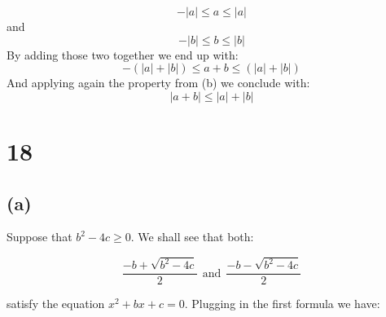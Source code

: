 \documentclass{article}
\begin{document}
\begin{equation*}
	-|a| \leq a \leq |a|
\end{equation*}
and
\begin{equation*}
	-|b| \leq b \leq |b|
\end{equation*}
By adding those two together we end up with:
\begin{equation*}
	-(|a| + |b|) \leq a + b \leq (|a| + |b|)
\end{equation*}
And applying again the property from (b) we conclude with:
\begin{equation*}
	|a + b| \leq |a| + |b|
\end{equation*}

\section*{18}

\subsection*{(a)}

Suppose that \(b^{2} - 4c \geq 0\). We shall see that both:

\begin{equation*}
	\frac{-b + \sqrt{b^{2} - 4c}}{2} \ \ \mbox{and} \ \ \frac{-b - \sqrt{b^{2} - 4c}}{2}
\end{equation*}

satisfy the equation \(x^{2} + bx + c = 0\). Plugging in the first formula we have:
\end{document}
